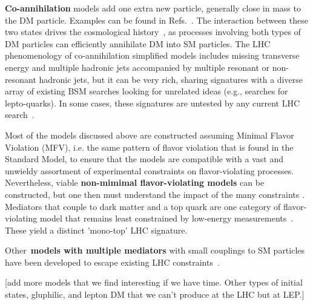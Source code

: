 \textbf{Co-annihilation} models add one extra new particle, generally close in mass to the DM particle. Examples can be found in Refs.~\cite{Buschmann:2016hkc,Baker:2015qna,Khoze:2017ixx}. The interaction between these two states drives the cosmological history~\cite{Ellis:1999mm,PlehnLecturesDM}, as processes involving both types of DM particles can efficiently annihilate DM into SM particles. The LHC phenomenology of co-annihilation simplified models includes missing transverse energy and multiple hadronic jets accompanied by multiple resonant or non-resonant hadronic jets, but it can be very rich, sharing signatures with a diverse array of existing BSM searches looking for unrelated ideas (e.g., searches for lepto-quarks). In some cases, these signatures are untested by any current LHC search~\cite{Buschmann:2016hkc}. 

Most of the models discussed above are constructed assuming Minimal Flavor Violation (MFV), i.e. the same pattern of flavor violation that is found in the Standard Model, to ensure that the models are compatible with a vast and unwieldy assortment of experimental constraints on flavor-violating processes. Nevertheless, viable \textbf{non-mimimal flavor-violating models} can be constructed, but one then must understand the impact of the many constraints \cite{Blanke:2017tnb}. Mediators that couple to dark matter and a top quark are one category of flavor-violating model that remains least constrained by low-energy measurements~\cite{DHondt:2015nat}. These yield a distinct 'mono-top' LHC signature. 

Other~\textbf{models with multiple mediators} with small couplings to SM particles have been developed to escape existing LHC constraints~\cite{Duerr:2016tmh}. 

[add more models that we find interesting if we have time. Other types of initial states, gluphilic, and lepton DM that we can't produce at the LHC but at LEP.]



